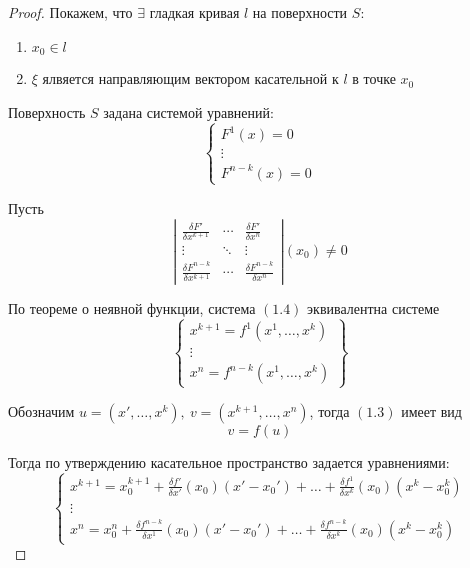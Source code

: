 \documentclass{report}
\theoremstyle{definition}
\begin{document}
\begin{proof}
  Покажем, что $\exists$ гладкая кривая $l$ на поверхности $S$:
  \begin{enumerate}
    \item $x_0 \in l$
    \item $\xi$ ялвяется направляющим вектором касательной к $l$ в точке $x_0$
  \end{enumerate}

  Поверхность $S$ задана системой уравнений:
  \begin{equation}
    \left\{\begin{array}{l}
      F^1(x) = 0 \\
      \vdots     \\
      F^{n-k}(x) = 0
    \end{array}\right.
  \end{equation}

  Пусть
  \begin{equation*}
    \left|\begin{array}{ccc}
      \frac{\delta F'}{\delta x^{k+1}}      & \cdots & \frac{\delta F'}{\delta x^n}      \\
      \vdots                                & \ddots & \vdots                            \\
      \frac{\delta F^{n-k}}{\delta x^{k+1}} & \cdots & \frac{\delta F^{n-k}}{\delta x^n}
    \end{array}\right| (x_0) \ne 0
  \end{equation*}

  По теореме о неявной функции, система $(1.4)$ эквивалентна системе
  \begin{equation}
    \left\{\begin{array}{l}
      x^{k+1} = f^1(x^1,\ldots,x^k) \\
      \vdots                        \\
      x^n = f^{n-k}(x^1,\ldots,x^k)
    \end{array}\right\}
  \end{equation}

  Обозначим $u = (x',\ldots,x^k), \ v = (x^{k+1},\ldots,x^n)$, тогда $(1.3)$ имеет вид
  \begin{equation*}
    v = f(u)
  \end{equation*}

  Тогда по утверждению касательное пространство задается уравнениями:
  \begin{equation}
    \left\{\begin{array}{l}
      x^{k+1} = x_0^{k + 1} + \frac{\delta f'}{\delta x'}(x_0)(x'-x_0') + \ldots + \frac{\delta f^1}{\delta x^k}(x_0)(x^k - x_0^k) \\
      \vdots                                                                                                                       \\
      x^n = x_0^n + \frac{\delta f^{n-k}}{\delta x^1}(x_0)(x' - x_0') + \ldots + \frac{\delta f^{n-k}}{\delta x^k}(x_0)(x^k - x_0^k)
    \end{array}\right.
  \end{equation}


\end{proof}
\end{document}
